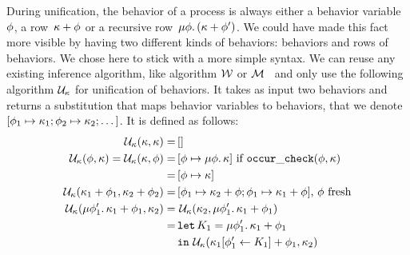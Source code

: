 \documentclass[9pt,preprint]{sigplanconf}
\begin{document}
During unification, the behavior of a process is always either a behavior variable~$\phi$, a row~$\kappa + \phi$ or a recursive row~$\mu \phi.\, (\kappa + \phi')$. We could have made this fact more visible by having two different kinds of behaviors: behaviors and rows of behaviors. We chose here to stick with a more simple syntax. We can reuse any existing inference algorithm, like algorithm $\mathcal{W}$ or $\mathcal{M}$~\cite{Lee:1998a} and only use the following algorithm $\mathcal{U}_{\kappa}$ for unification of behaviors. It takes as input two behaviors and returns a substitution that maps behavior variables to behaviors, that we denote $[\phi_1 \mapsto \kappa_1; \phi_2 \mapsto \kappa_2; \dots]$. It is defined as follows:
%
\allowdisplaybreaks
\begin{align*}
\mathcal{U}_{\kappa}(\kappa, \kappa) =&\, [] \\
\mathcal{U}_{\kappa}(\phi, \kappa) = \mathcal{U}_{\kappa}(\kappa, \phi) =
					&\, [\phi \mapsto  \mu \phi.\, \kappa ]  \text{ if } \mathtt{occur\_check}(\phi, \kappa) \\
					= &\,  [\phi \mapsto \kappa] \\
\mathcal{U}_{\kappa}(\kappa_1 + \phi_1, \kappa_2 + \phi_2) =&\,
                  [\phi_1 \mapsto \kappa_2 + \phi;  \phi_1 \mapsto \kappa_1 + \phi ]  \text{, } \phi \text{ fresh} \\
\mathcal{U}_{\kappa}(\mu \phi'_1.\, \kappa_1 + \phi_1, \kappa_2) 
    = &\, \,\mathcal{U}_{\kappa}(\kappa_2, \mu \phi'_1.\, \kappa_1 + \phi_1) \\ 
    = &\, \mathtt{let}\, K_1 = \mu \phi'_1.\, \kappa_1 + \phi_1 \\
    &\, \mathtt{in}\,\, \mathcal{U}_{\kappa}( \kappa_1[\phi'_1 \leftarrow K_1] + \phi_1 , \kappa_2) 
\end{align*}
\end{document}

